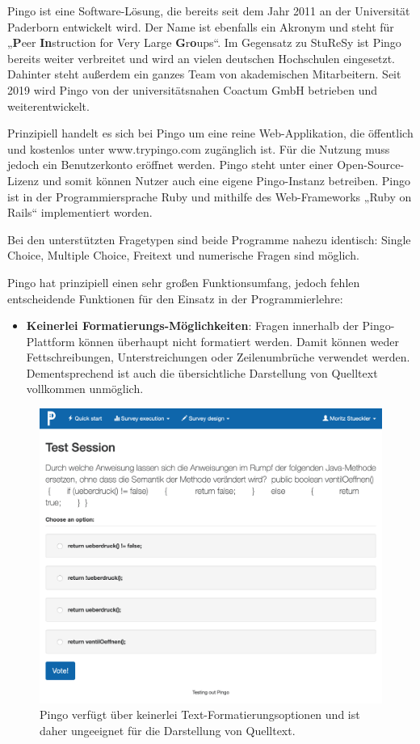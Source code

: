 Pingo ist eine Software-Lösung, die bereits seit dem Jahr 2011 an der Universität Paderborn entwickelt wird. Der Name ist ebenfalls ein Akronym und steht für „\textbf{P}eer \textbf{In}struction for Very Large \textbf{G}r\textbf{o}ups“. Im Gegensatz zu StuReSy ist Pingo bereits weiter verbreitet und wird an vielen deutschen Hochschulen eingesetzt. Dahinter steht außerdem ein ganzes Team von akademischen Mitarbeitern. Seit 2019 wird Pingo von der universitätsnahen Coactum GmbH betrieben und weiterentwickelt.\newline

Prinzipiell handelt es sich bei Pingo um eine reine Web-Applikation, die öffentlich und kostenlos unter www.trypingo.com zugänglich ist. Für die Nutzung muss jedoch ein Benutzerkonto eröffnet werden. Pingo steht unter einer Open-Source-Lizenz und somit können Nutzer auch eine eigene Pingo-Instanz betreiben. Pingo ist in der Programmiersprache Ruby und mithilfe des Web-Frameworks „Ruby on Rails“ implementiert worden.

Bei den unterstützten Fragetypen sind beide Programme nahezu identisch: Single Choice, Multiple Choice, Freitext und numerische Fragen sind möglich.


Pingo hat prinzipiell einen sehr großen Funktionsumfang, jedoch fehlen entscheidende Funktionen für den Einsatz in der Programmierlehre:
\begin{itemize}
    \item \textbf{Keinerlei Formatierungs-Möglichkeiten}: Fragen innerhalb der Pingo-Plattform können überhaupt nicht formatiert werden. Damit können weder Fettschreibungen, Unterstreichungen oder Zeilenumbrüche verwendet werden. Dementsprechend ist auch die übersichtliche Darstellung von Quelltext vollkommen unmöglich.
\end{itemize}

\begin{figure}[H]
    \includegraphics[width=12cm]{chapter/bewertung/bilder/pingo_problem1.png}
    \centering
    \caption{Pingo verfügt über keinerlei Text-Formatierungsoptionen und ist daher ungeeignet für die Darstellung von Quelltext.}
    \label{Abbildung 2.4}
\end{figure}